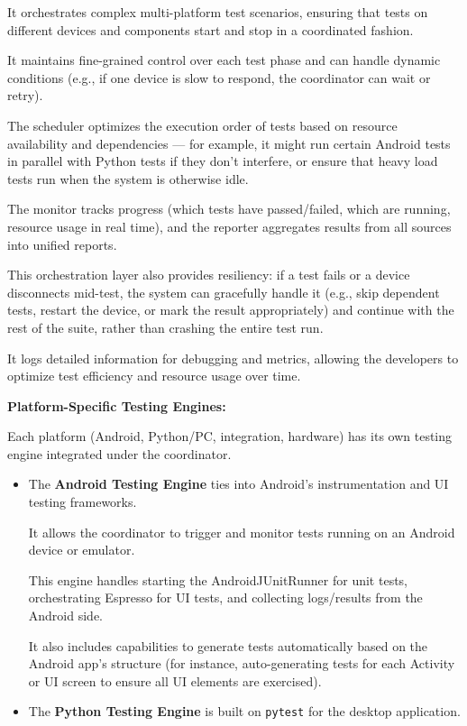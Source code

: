 {{It orchestrates complex multi-platform test scenarios, ensuring that tests on
different devices and components start and stop in a coordinated fashion.

It maintains fine-grained control over each test phase and can handle dynamic
conditions (e.g., if one device is slow to respond, the coordinator can wait or
retry).

The scheduler optimizes the execution order of tests based on resource availability
and dependencies --- for example, it might run certain Android tests in parallel with
Python tests if they don't interfere, or ensure that heavy load tests run when the
system is otherwise idle.

The monitor tracks progress (which tests have passed/failed, which are running,
resource usage in real time), and the reporter aggregates results from all sources
into unified reports.

This orchestration layer also provides resiliency: if a test fails or a device
disconnects mid-test, the system can gracefully handle it (e.g., skip dependent
tests, restart the device, or mark the result appropriately) and continue with the
rest of the suite, rather than crashing the entire test run.

It logs detailed information for debugging and metrics, allowing the developers to
optimize test efficiency and resource usage over time.

\textbf{Platform-Specific Testing Engines:}

Each platform (Android, Python/PC, integration, hardware) has its own testing engine
integrated under the coordinator.

\begin{itemize}

\item The \textbf{Android Testing Engine}
 ties into Android's instrumentation and UI testing frameworks.

It allows the coordinator to trigger and monitor tests running on an Android device
or emulator.

This engine handles starting the AndroidJUnitRunner for unit tests, orchestrating
Espresso for UI tests, and collecting logs/results from the Android side.

It also includes capabilities to generate tests automatically based on the Android
app's structure (for instance, auto-generating tests for each Activity or UI screen
to ensure all UI elements are exercised).

\item The \textbf{Python Testing Engine}
 is built on \texttt{pytest} for the desktop application.


\end{itemize}}}
